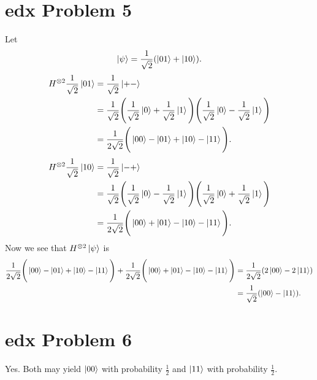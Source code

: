\documentclass[10pt]{article}
\begin{document}
\section*{edx Problem 5}
Let
\[
\ket{\psi} = \frac{1}{\sqrt{2}} (\ket{01} + \ket{10}).
\]
\begin{align*}
H^{\otimes 2} \frac{1}{\sqrt{2}} \ket{01} &= \frac{1}{\sqrt{2}} \ket{+-} \\
                                        						&= \frac{1}{\sqrt{2}} \Bigg( \frac{1}{\sqrt{2}} \ket{0} + \frac{1}{\sqrt{2}} \ket{1} \Bigg)\Bigg( \frac{1}{\sqrt{2}} \ket{0} - \frac{1}{\sqrt{2}} \ket{1} \Bigg) \\
                                        						&= \frac{1}{2\sqrt{2}} \Bigg( \ket{00} - \ket{01} + \ket{10} - \ket{11} \Bigg).
\end{align*}
\begin{align*}
H^{\otimes 2} \frac{1}{\sqrt{2}} \ket{10} &= \frac{1}{\sqrt{2}} \ket{-+} \\
                                        						&= \frac{1}{\sqrt{2}} \Bigg( \frac{1}{\sqrt{2}} \ket{0} - \frac{1}{\sqrt{2}} \ket{1} \Bigg)\Bigg( \frac{1}{\sqrt{2}} \ket{0} + \frac{1}{\sqrt{2}} \ket{1} \Bigg) \\
                                        						&= \frac{1}{2\sqrt{2}} \Bigg( \ket{00} + \ket{01} - \ket{10} - \ket{11} \Bigg).
\end{align*}
Now we see that $H^{\otimes 2} \ket{\psi}$ is
\begin{align*}
\frac{1}{2\sqrt{2}} \Bigg( \ket{00} - \ket{01} + \ket{10} - \ket{11} \Bigg) + \frac{1}{2\sqrt{2}} \Bigg( \ket{00} + \ket{01} - \ket{10} - \ket{11} \Bigg) &= \frac{1}{2\sqrt{2}} (2\ket{00} - 2\ket{11}) \\
     &= \frac{1}{\sqrt{2}} (\ket{00} - \ket{11}).
\end{align*}

\section*{edx Problem 6}
Yes. Both may yield $\ket{00}$ with probability $\frac{1}{2}$ and $\ket{11}$ with probability $\frac{1}{2}$.
\end{document}

